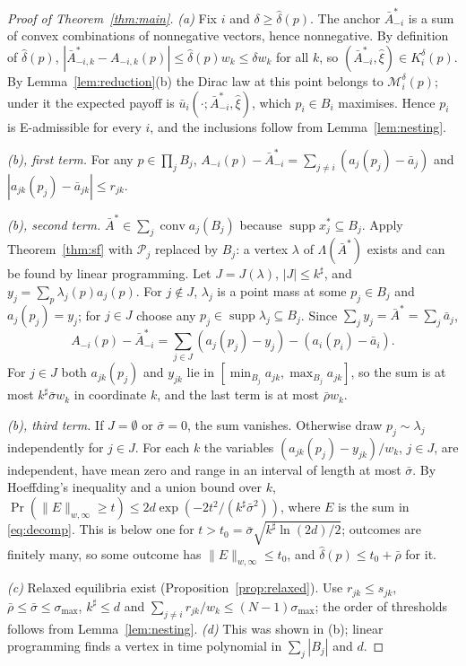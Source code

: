 \documentclass[preprint,12pt]{elsarticle}
\theoremstyle{definition}
\theoremstyle{remark}
\newcommand{\cP}{\mathcal{P}}
\newcommand{\cM}{\mathcal{M}}
\newcommand{\ub}{\bar u}
\newcommand{\abar}{\bar a}
\newcommand{\Abar}{\bar A}
\newcommand{\conv}{\operatorname{conv}}
\newcommand{\supp}{\operatorname{supp}}
\begin{document}
\begin{proof}[Proof of Theorem~\ref{thm:main}]
\emph{(a)} Fix $i$ and $\delta\ge\hat\delta(p)$. The anchor $\Abar^*_{-i}$ is a sum of convex combinations of nonnegative vectors, hence nonnegative. By definition of $\hat\delta(p)$, $|\Abar^*_{-i,k}-A_{-i,k}(p)|\le\hat\delta(p)w_k\le\delta w_k$ for all $k$, so $(\Abar^*_{-i},\hat\xi)\in K_i^\delta(p)$. By Lemma~\ref{lem:reduction}(b) the Dirac law at this point belongs to $\cM_i^\delta(p)$; under it the expected payoff is $\ub_i(\cdot;\Abar^*_{-i},\hat\xi)$, which $p_i\in B_i$ maximises. Hence $p_i$ is E-admissible for every $i$, and the inclusions follow from Lemma~\ref{lem:nesting}.

\emph{(b), first term.} For any $p\in\prod_jB_j$, $A_{-i}(p)-\Abar^*_{-i}=\sum_{j\ne i}(a_j(p_j)-\abar_j)$ and $|a_{jk}(p_j)-\abar_{jk}|\le r_{jk}$.

\emph{(b), second term.} $\Abar^*\in\sum_j\conv a_j(B_j)$ because $\supp x_j^*\subseteq B_j$. Apply Theorem~\ref{thm:sf} with $\cP_j$ replaced by $B_j$: a vertex $\lambda$ of $\Lambda(\Abar^*)$ exists and can be found by linear programming. Let $J=J(\lambda)$, $|J|\le k^\sharp$, and $y_j=\sum_p\lambda_j(p)a_j(p)$. For $j\notin J$, $\lambda_j$ is a point mass at some $p_j\in B_j$ and $a_j(p_j)=y_j$; for $j\in J$ choose any $p_j\in\supp\lambda_j\subseteq B_j$. Since $\sum_jy_j=\Abar^*=\sum_j\abar_j$,
\begin{equation}\label{eq:decomp}
A_{-i}(p)-\Abar^*_{-i}=\textstyle\sum_{j\in J}(a_j(p_j)-y_j)-(a_i(p_i)-\abar_i).
\end{equation}
For $j\in J$ both $a_{jk}(p_j)$ and $y_{jk}$ lie in $[\min_{B_j}a_{jk},\max_{B_j}a_{jk}]$, so the sum is at most $k^\sharp\bar\sigma w_k$ in coordinate $k$, and the last term is at most $\bar\rho w_k$.

\emph{(b), third term.} If $J=\emptyset$ or $\bar\sigma=0$, the sum vanishes. Otherwise draw $p_j\sim\lambda_j$ independently for $j\in J$. For each $k$ the variables $(a_{jk}(p_j)-y_{jk})/w_k$, $j\in J$, are independent, have mean zero and range in an interval of length at most $\bar\sigma$. By Hoeffding's inequality and a union bound over $k$, $\Pr(\|E\|_{w,\infty}\ge t)\le2d\exp(-2t^2/(k^\sharp\bar\sigma^2))$, where $E$ is the sum in \eqref{eq:decomp}. This is below one for $t>t_0=\bar\sigma\sqrt{k^\sharp\ln(2d)/2}$; outcomes are finitely many, so some outcome has $\|E\|_{w,\infty}\le t_0$, and $\hat\delta(p)\le t_0+\bar\rho$ for it.

\emph{(c)} Relaxed equilibria exist (Proposition~\ref{prop:relaxed}). Use $r_{jk}\le s_{jk}$, $\bar\rho\le\bar\sigma\le\sigma_{\max}$, $k^\sharp\le d$ and $\sum_{j\ne i}r_{jk}/w_k\le(N-1)\sigma_{\max}$; the order of thresholds follows from Lemma~\ref{lem:nesting}. \emph{(d)} This was shown in (b); linear programming finds a vertex in time polynomial in $\sum_j|B_j|$ and $d$.
\end{proof}
\end{document}
